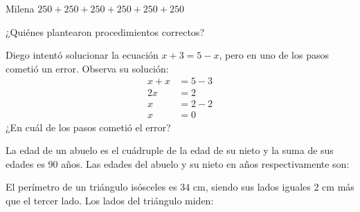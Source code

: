 \documentclass[letterpaper,10pt]{examdesign}
\begin{document}
\begin{multiplechoice}[keycolumns=4,examcolumns=2]
\begin{question}
\begin{tabbing}
Milena \> $250+250+250+250+250+250$ 
\end{tabbing} 
¿Quiénes plantearon procedimientos correctos?
\end{question}
\begin{question}
Diego intent\'o solucionar la ecuación $x+3=5-x$, pero en uno de los pasos cometió un
error. Observa su solución:
\begin{align}
x+x&=5-3\\
2x&=2\\
x&=2-2\\
x&=0
\end{align}
¿En cuál de los pasos cometió el error?
\end{question}
\begin{question}
La edad de un abuelo es el cuádruple de la edad de su nieto y la suma de sus edades es 90 años. Las edades del abuelo y su nieto en años respectivamente son:
\end{question}
\begin{question}
El perímetro de un triángulo isósceles es 34 cm, siendo sus lados iguales 2 cm más que el tercer lado. Los lados del triángulo miden:
\end{question}
\end{multiplechoice}
\end{document}
